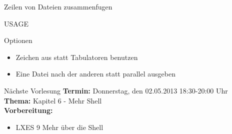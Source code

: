 \documentclass[aspectratio=43]{beamer}
\begin{document}
\begin{frame} 
	\begin{block}{} 
        Zeilen von Dateien zusammenfugen
	\end{block}
	\begin{block}{USAGE} 
	\end{block}
	\begin{exampleblock}{Optionen} 
	\begin{itemize}
	\item {} Zeichen aus  statt Tabulatoren benutzen
	\item {} Eine Datei nach der anderen statt parallel ausgeben
	\end{itemize}
	\end{exampleblock}
\end{frame}


\begin{frame}[plain]
\begin{alertblock}{Nächste Vorlesung}
\textbf{Termin:} Donnerstag, den 02.05.2013 18:30-20:00 Uhr\\
\textbf{Thema:} Kapitel 6 - Mehr Shell \\
\textbf{Vorbereitung:} 
\begin{itemize}
\item LXES 9 Mehr über die Shell
\end{itemize}
\end{alertblock}
\end{frame}

\materialframe
\end{document}
